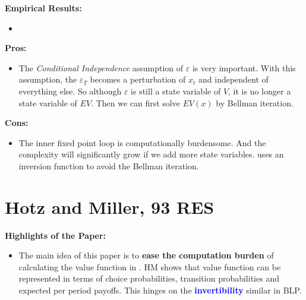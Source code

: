 \documentclass{book}
\theoremstyle{plain}
\theoremstyle{definition}
\begin{document}
\vspace{1em}
\noindent
\textbf{Empirical Results:}
\begin{itemize}
	\item 
\end{itemize}

\vspace{1em}
\noindent
\textbf{Pros:}
\begin{itemize}
	\item The \textit{Conditional Independence} assumption of $\varepsilon$ is very important. With this assumption, the $\varepsilon_T$ becomes a perturbation of $x_t$ and independent of everything else.
	So although $\varepsilon$ is still a state variable of $V$, it is no longer a state variable of $EV$. 
	Then we can first solve $EV(x)$ by Bellman iteration.
\end{itemize}

\vspace{1em}
\noindent
\textbf{Cons:}
\begin{itemize}
	\item The inner fixed point loop is computationally burdensome. And the complexity will significantly grow if we add more state variables. \cite{Hotz:1993ea} uses an inversion function to avoid the Bellman iteration.
\end{itemize}




\section{Hotz and Miller, 93 RES} %
\label{sec:hotz_and_miller_93_res}

\textbf{}

\vspace{1em}
\noindent
\textbf{Highlights of the Paper:}
\begin{itemize}
	\item The main idea of this paper is to \textbf{ease the computation burden} of calculating the value function in \cite{Rust:1987hn}.
	HM shows that value function can be represented in terms of choice probabilities, transition probabilities and expected per period payoffs. This hinges on the \textbf{
	\textcolor{blue}{invertibility}} similar in BLP.
\end{itemize}
\end{document}
